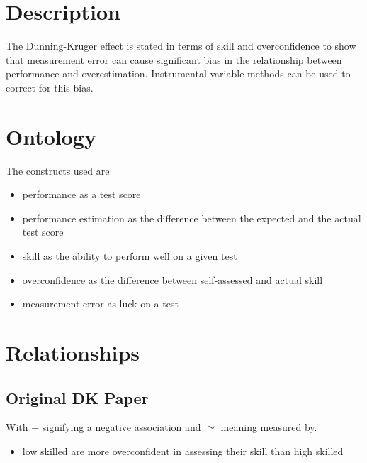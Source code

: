 \documentclass[a4paper,11pt]{article}
\newcommand{\1}{\mathbf{1}}
\begin{document}
\section{Description}
The Dunning-Kruger effect is stated in terms of skill and overconfidence to show that measurement error can cause significant bias in the relationship between performance and overestimation.
Instrumental variable methods can be used to correct for this bias.

\section{Ontology}
The constructs used are
\begin{itemize}
 \item performance as a test score
 \item performance estimation as the difference between the expected and the actual test score
 \item skill as the ability to perform well on a given test
 \item overconfidence as the difference between self-assessed and actual skill
 \item measurement error as luck on a test
\end{itemize}

\section{Relationships}

\subsection{Original DK Paper}

\begin{figure}[ht]
  \vspace{1cm}
  \begin{center}
  
  \end{center}
  \label{fig:typetree}
\end{figure}

With $-$ signifying a negative association and $\simeq$ meaning measured by.

\begin{itemize}
 \item low skilled are more overconfident in assessing their skill than high skilled
\end{itemize}
\end{document}
